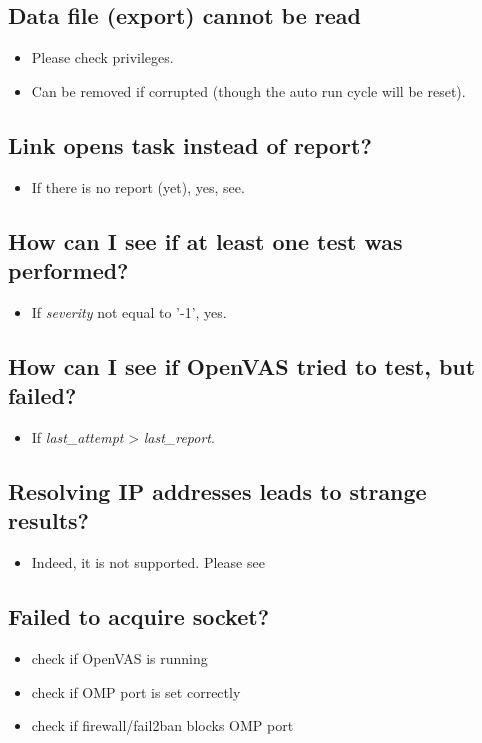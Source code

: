 \subsection*{Data file (export) cannot be read}
\begin{itemize}
\item Please check privileges.
\item Can be removed if corrupted (though the auto run cycle will be reset).
\end{itemize}

\subsection*{Link opens task instead of report?}
\begin{itemize}
\item If there is no report (yet), yes, see.
\end{itemize}

\subsection*{How can I see if at least one test was performed?}
\begin{itemize}
\item If \emph{severity} not equal to '-1', yes.
\end{itemize}

\subsection*{How can I see if OpenVAS tried to test, but failed?}
\begin{itemize}
\item If \emph{last\_attempt} > \emph{last\_report}.
\end{itemize}

\subsection*{Resolving IP addresses leads to strange results?}
\begin{itemize}
\item Indeed, it is not supported. Please see 
\end{itemize}

\subsection*{Failed to acquire socket?}
\begin{itemize}
\item check if OpenVAS is running
\item check if OMP port is set correctly
\item check if firewall/fail2ban blocks OMP port
\end{itemize}

